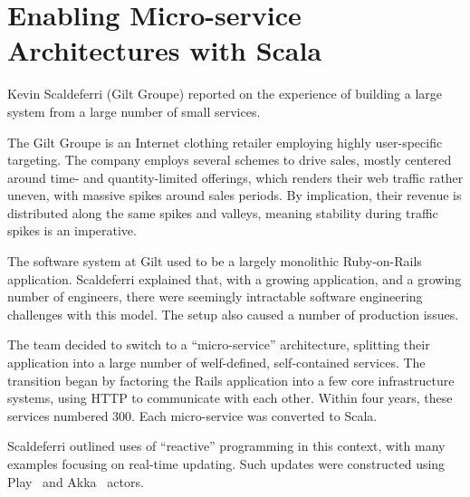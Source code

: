 \documentclass{jfp1}
\begin{document}
\section{Enabling Micro-service Architectures with Scala}


Kevin Scaldeferri (Gilt Groupe) reported on the experience of building a
large system from a large number of small services.

The Gilt Groupe is an Internet clothing retailer employing highly
user-specific targeting. The company employs several schemes to drive
sales, mostly centered around time- and quantity-limited offerings, which
renders their web traffic rather uneven, with massive spikes around sales
periods. By implication, their revenue is distributed along the same
spikes and valleys, meaning stability during traffic spikes is an
imperative.

The software system at Gilt used to be a largely monolithic Ruby-on-Rails
application.  Scaldeferri explained that, with a growing application, and
a growing number of engineers, there were seemingly intractable software
engineering challenges with this model. The setup also caused a number of
production issues.

The team decided to switch to a ``micro-service'' architecture, splitting
their application into a large number of welf-defined, self-contained
services. The transition began by factoring the Rails application into a
few core infrastructure systems, using HTTP to communicate with each
other. Within four years, these services numbered 300. Each micro-service
was converted to Scala. 

Scaldeferri outlined uses of ``reactive'' programming in this context,
with many examples focusing on real-time updating.  Such updates were
constructed using Play~\cite{Typesafe:2014:Play} and
Akka~\cite{Typesafe:2014:Akka} actors.
\end{document}
